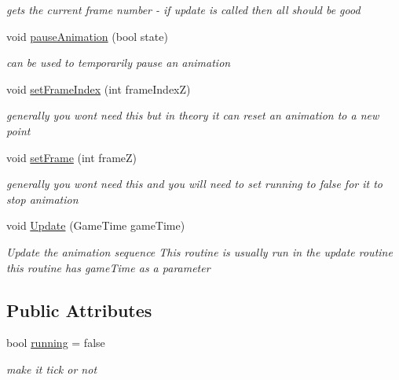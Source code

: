\begin{DoxyCompactItemize}
\begin{DoxyCompactList}\small\item\em gets the current frame number -\/ if update is called then all should be good \end{DoxyCompactList}\item 
void \mbox{\hyperlink{class_r_c___framework_1_1_animation_ticker_ad5efbd9a22b71acdb310cbf36bfc3ed4}{pause\+Animation}} (bool state)
\begin{DoxyCompactList}\small\item\em can be used to temporarily pause an animation \end{DoxyCompactList}\item 
void \mbox{\hyperlink{class_r_c___framework_1_1_animation_ticker_a651ebc93d3b81476de57192aa0ed7ac0}{set\+Frame\+Index}} (int frame\+IndexZ)
\begin{DoxyCompactList}\small\item\em generally you wont need this but in theory it can reset an animation to a new point \end{DoxyCompactList}\item 
void \mbox{\hyperlink{class_r_c___framework_1_1_animation_ticker_ab35ac03afdb37b3f59a15eb08c7daa0f}{set\+Frame}} (int frameZ)
\begin{DoxyCompactList}\small\item\em generally you wont need this and you will need to set running to false for it to stop animation \end{DoxyCompactList}\item 
void \mbox{\hyperlink{class_r_c___framework_1_1_animation_ticker_a6d859fd88b02f11b5ce36d72f307f2da}{Update}} (Game\+Time game\+Time)
\begin{DoxyCompactList}\small\item\em Update the animation sequence This routine is usually run in the update routine this routine has game\+Time as a parameter \end{DoxyCompactList}\end{DoxyCompactItemize}
\subsection*{Public Attributes}
\begin{DoxyCompactItemize}
\item 
bool \mbox{\hyperlink{class_r_c___framework_1_1_animation_ticker_aa510bfceffc13acf2a6175094794d783}{running}} = false
\begin{DoxyCompactList}\small\item\em make it tick or not \end{DoxyCompactList}\end{DoxyCompactItemize}


